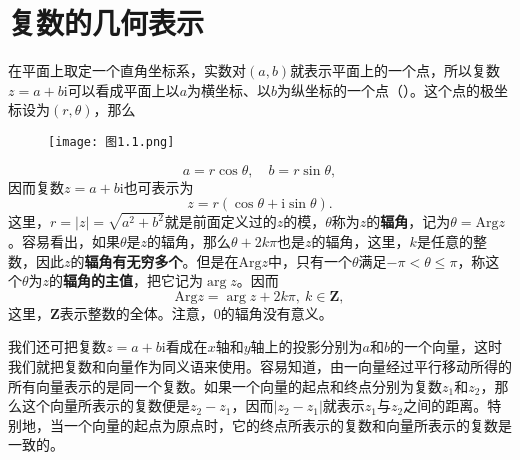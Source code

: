 \documentclass[../../main.tex]{subfiles}
\begin{document}
\section{复数的几何表示}

在平面上取定一个直角坐标系，实数对\((a,b)\)就表示平面上的一个点，所以复数\(z = a + b\mathrm{i}\)可以看成平面上以\(a\)为横坐标、以\(b\)为纵坐标的一个点（）。这个点的极坐标设为\((r,\theta)\)，那么
\begin{figure}[H]
\centering
\texttt{[image: 图1.1.png]}
\caption{}
\label{figure:图1.1}
\end{figure}
\[
a = r\cos\theta, \quad b = r\sin\theta,
\]
因而复数\(z = a + b\mathrm{i}\)也可表示为
\[
z = r(\cos\theta + \mathrm{i}\sin\theta).
\]
这里，\(r = |z| = \sqrt{a^2 + b^2}\)就是前面定义过的\(z\)的模，\(\theta\)称为\(z\)的\textbf{辐角}，记为\(\theta = \mathrm{Arg}z\)。容易看出，如果\(\theta\)是\(z\)的辐角，那么\(\theta + 2k\pi\)也是\(z\)的辐角，这里，\(k\)是任意的整数，因此\(z\)的\textbf{辐角有无穷多个}。但是在\(\mathrm{Arg}z\)中，只有一个\(\theta\)满足\(-\pi < \theta \leqslant \pi\)，称这个\(\theta\)为\(z\)的\textbf{辐角的主值}，把它记为\(\arg z\)。因而
\[
\mathrm{Arg}z = \arg z + 2k\pi, \ k \in \mathbf{Z},
\]
这里，\(\mathbf{Z}\)表示整数的全体。注意，\(0\)的辐角没有意义。

我们还可把复数\(z = a + b\mathrm{i}\)看成在\(x\)轴和\(y\)轴上的投影分别为\(a\)和\(b\)的一个向量，这时我们就把复数和向量作为同义语来使用。容易知道，由一向量经过平行移动所得的所有向量表示的是同一个复数。如果一个向量的起点和终点分别为复数\(z_1\)和\(z_2\)，那么这个向量所表示的复数便是\(z_2 - z_1\)，因而\(|z_2 - z_1|\)就表示\(z_1\)与\(z_2\)之间的距离。特别地，当一个向量的起点为原点时，它的终点所表示的复数和向量所表示的复数是一致的。
\end{document}
